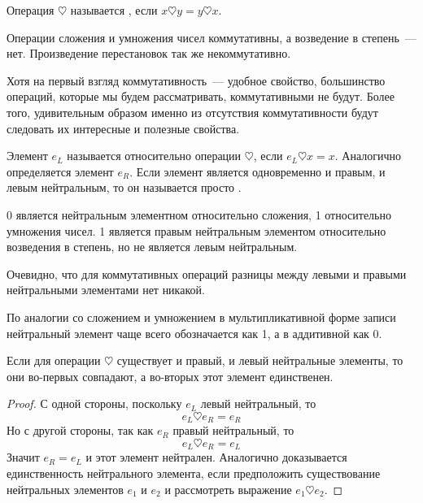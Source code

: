 \begin{definition}
Операция $\heartsuit$ называется , если $x\heartsuit y = y\heartsuit x$.
\end{definition}

\begin{example}
Операции сложения и умножения чисел коммутативны, а возведение в степень~--- нет. Произведение перестановок так же некоммутативно.
\end{example}

Хотя на первый взгляд коммутативность~--- удобное свойство, большинство операций, которые мы будем рассматривать, коммутативными не будут. Более того, удивительным образом именно из отсутствия коммутативности будут следовать их интересные и полезные свойства.

\begin{definition}
Элемент $e_L$ называется  относительно операции $\heartsuit$, если $e_L\heartsuit x = x$. Аналогично определяется  элемент $e_R$. Если элемент является одновременно и правым, и левым нейтральным, то он называется просто .
\end{definition}

\begin{example}
0 является нейтральным элементном относительно сложения, 1 относительно умножения чисел. 1 является правым нейтральным элементом относительно возведения в степень, но не является левым нейтральным.
\end{example}

Очевидно, что для коммутативных операций разницы между левыми и правыми нейтральными элементами нет никакой.

По аналогии со сложением и умножением в мультипликативной форме записи нейтральный элемент чаще всего обозначается как 1, а в аддитивной как 0.

\begin{thm}
Если для операции $\heartsuit$ существует и правый, и левый нейтральные элементы, то они во-первых совпадают, а во-вторых этот элемент единственен.
\end{thm}
\begin{proof}
С одной стороны, поскольку $e_L$ левый нейтральный, то
$$e_L\heartsuit e_R = e_R$$
Но с другой стороны, так как $e_R$ правый нейтральный, то
$$e_L\heartsuit e_R = e_L$$
Значит $e_R=e_L$ и этот элемент нейтрален. Аналогично доказывается единственность нейтрального элемента, если предположить существование нейтральных элементов $e_1$ и $e_2$ и рассмотреть выражение $e_1\heartsuit e_2$. 
\end{proof}

